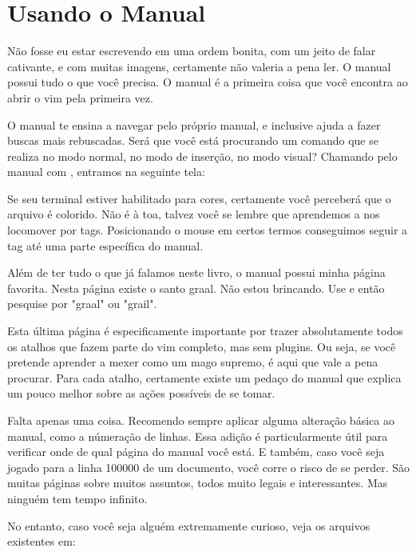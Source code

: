 \chapter{Usando o Manual}
Não fosse eu estar escrevendo em uma ordem bonita, com um jeito de falar cativante,
e com muitas imagens, certamente não valeria a pena ler.
O manual possui tudo o que você precisa.
O manual é a primeira coisa que você encontra ao abrir o vim pela primeira vez.


O manual te ensina a navegar pelo próprio manual, e inclusive ajuda a fazer buscas mais rebuscadas.
Será que você está procurando um comando que se realiza no modo normal, no modo de inserção, no modo visual?
Chamando pelo manual com , entramos na seguinte tela:


Se seu terminal estiver habilitado para cores, certamente você perceberá que o arquivo é colorido.
Não é à toa, talvez você se lembre que aprendemos a nos locomover por tags.
Posicionando o mouse em certos termos conseguimos seguir a tag até uma parte específica do manual.

Além de ter tudo o que já falamos neste livro, o manual possui minha página favorita.
Nesta página existe o santo graal.
Não estou brincando.
Use  e então pesquise por "graal" ou "grail".

Esta última página é especificamente importante por trazer absolutamente todos os atalhos que fazem
parte do vim completo, mas sem plugins.
Ou seja, se você pretende aprender a mexer como um mago supremo, é aqui que vale a pena procurar.
Para cada atalho, certamente existe um pedaço do manual que explica um pouco melhor sobre as ações possíveis de se tomar.

Falta apenas uma coisa. Recomendo sempre aplicar alguma alteração básica ao manual, como a númeração de linhas.
Essa adição é particularmente útil para verificar onde de qual página do manual você está.
E também, caso você seja jogado para a linha 100000 de um documento, você corre o risco de se perder.
São muitas páginas sobre muitos assuntos, todos muito legais e interessantes.
Mas ninguém tem tempo infinito.

No entanto, caso você seja alguém extremamente curioso, veja os arquivos existentes em:

